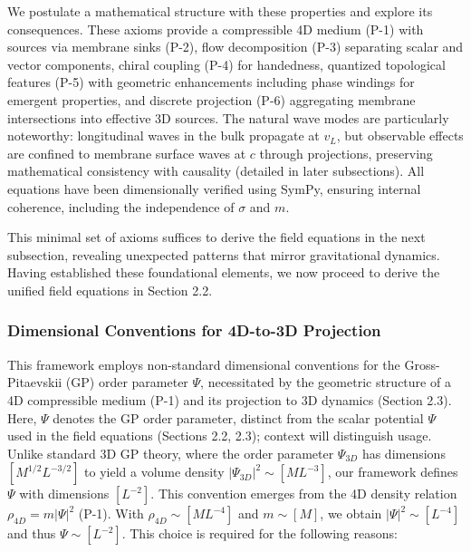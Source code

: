 We postulate a mathematical structure with these properties and explore its consequences. These axioms provide a compressible 4D medium (P-1) with sources via membrane sinks (P-2), flow decomposition (P-3) separating scalar and vector components, chiral coupling (P-4) for handedness, quantized topological features (P-5) with geometric enhancements including phase windings for emergent properties, and discrete projection (P-6) aggregating membrane intersections into effective 3D sources. The natural wave modes are particularly noteworthy: longitudinal waves in the bulk propagate at $v_L$, but observable effects are confined to membrane surface waves at $c$ through projections, preserving mathematical consistency with causality (detailed in later subsections). All equations have been dimensionally verified using SymPy, ensuring internal coherence, including the independence of $\sigma$ and $m$.

This minimal set of axioms suffices to derive the field equations in the next subsection, revealing unexpected patterns that mirror gravitational dynamics. Having established these foundational elements, we now proceed to derive the unified field equations in Section 2.2.

\medskip
\noindent
{}
\medskip

\subsubsection{Dimensional Conventions for 4D-to-3D Projection}
\label{subsec:dimensional_conventions}

This framework employs non-standard dimensional conventions for the Gross-Pitaevskii (GP) order parameter $\Psi$, necessitated by the geometric structure of a 4D compressible medium (P-1) and its projection to 3D dynamics (Section 2.3). Here, $\Psi$ denotes the GP order parameter, distinct from the scalar potential $\Psi$ used in the field equations (Sections 2.2, 2.3); context will distinguish usage. Unlike standard 3D GP theory, where the order parameter $\Psi_{3D}$ has dimensions $[M^{1/2} L^{-3/2}]$ to yield a volume density $|\Psi_{3D}|^2 \sim [M L^{-3}]$, our framework defines $\Psi$ with dimensions $[L^{-2}]$. This convention emerges from the 4D density relation $\rho_{4D} = m |\Psi|^2$ (P-1). With $\rho_{4D} \sim [M L^{-4}]$ and $m \sim [M]$, we obtain $|\Psi|^2 \sim [L^{-4}]$ and thus $\Psi \sim [L^{-2}]$. This choice is required for the following reasons:

